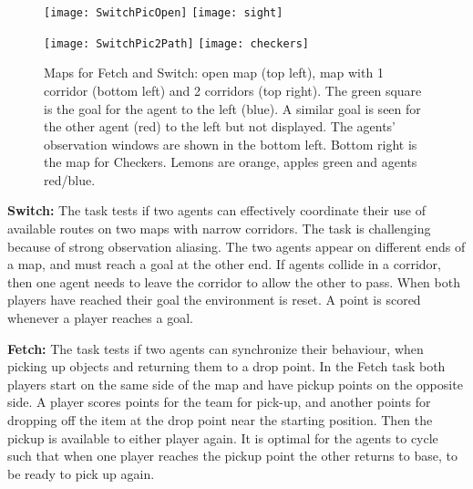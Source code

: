 \documentclass{article}
\begin{document}
\begin{SCfigure}
\begin{figure}
\begin{minipage}{.5\textwidth}
\centering
\texttt{[image: SwitchPicOpen]}
\vspace{0.05cm}
\texttt{[image: sight]}


\end{minipage}
\begin{minipage}{.5\textwidth}
\centering
\texttt{[image: SwitchPic2Path]}
\vspace{0.05cm}
\texttt{[image: checkers]} \end{minipage}
\caption{Maps for Fetch and Switch: open map (top left), map with 1 corridor (bottom left) and 2 corridors (top right). The green square is the goal for the agent to the left (blue). A similar goal is seen for the other agent (red) to the left but not displayed. The agents' observation windows are shown in the bottom left. Bottom right is the map for Checkers. Lemons are orange, apples green and agents red/blue.} \label{S0}
\end{figure}










{\bf Switch:} The task tests if two agents can effectively coordinate their use of available routes on two maps with narrow corridors. The task is challenging because of strong observation aliasing. The two agents appear on different ends of a map, and must reach a goal at the other end. If agents collide in a corridor, then one agent needs to leave the corridor to allow the other to pass. When both players have reached their goal the environment is reset. A point is scored whenever a player reaches a goal. 

{\bf Fetch:} The task tests if two agents can synchronize their behaviour, when picking up objects and returning them to a drop point. In the Fetch task both players start on the same side of the map and have pickup points on the opposite side. A player scores  points for the team for pick-up, and another  points for dropping off the item at the drop point near the starting position. Then the pickup is available to either player again. It is optimal for the agents to cycle such that when one player reaches the pickup point the other returns to base, to be ready to pick up again. 






\end{SCfigure}
\end{document}
